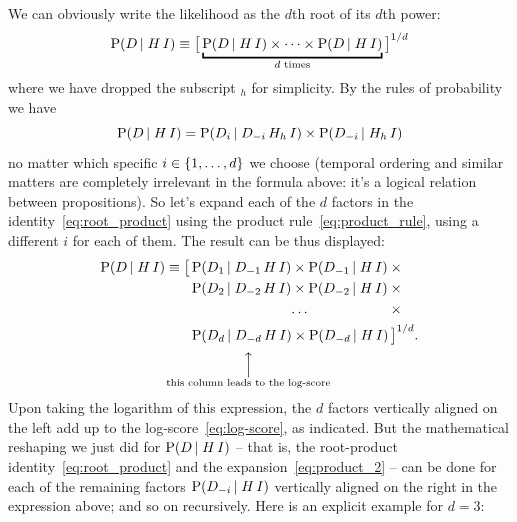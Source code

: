 \documentclass[\ifafour a4paper,12pt,\else a5paper,10pt,\fi%
onecolumn,oneside,article,%
british%
]{memoir}
\theoremstyle{remark}
\theoremstyle{innote}
\DeclarePairedDelimiter\set{\{}{\}}
\newcommand*{\p}{\mathrm{P}}%
\renewcommand*{\|}[1][]{\nonscript\,#1\vert\nonscript\;\mathopen{}}
\newcommand*{\yK}{I}
\begin{document}
We can obviously write the likelihood as the $d$th root of its $d$th power:
\begin{equation}
  \label{eq:root_product}
  \p(D \| H \, \yK) \equiv  \bigl[\,
  \underbracket{\p(D \| H \, \yK) \times \dotsm \times
  \p(D \| H \, \yK)}_{\text{$d$ times}}
  \,\bigr]^{1/d}
\end{equation}
where we have dropped the subscript ${}_{h}$ for simplicity. By the rules
of probability we have
\begin{equation}
  \label{eq:product_rule}
  \p(D \| H \, \yK) =
  \p(D_{i} \| D_{-i} \, H_{h} \, \yK) \times \p(D_{-i} \|  H_{h} \, \yK)
\end{equation}
no matter which specific $i \in \set{1, \dotsc, d}$ we choose (temporal
ordering and similar matters are completely irrelevant in the formula
above: it's a logical relation between propositions). So let's expand each
of the $d$ factors in the identity~\eqref{eq:root_product} using the
product rule~\eqref{eq:product_rule}, using a different $i$ for each of
them. The result can be thus displayed:
\begin{equation}
  \label{eq:product_2}
  \begin{aligned}
    \p(D \| H \, \yK) \equiv{}
    \bigl[\,&\p(D_{1} \| D_{-1} \, H \, \yK) \times
            \p(D_{-1} \|  H \, \yK) \times{}\\
          &\p(D_{2} \| D_{-2} \, H \, \yK) \times
            \p(D_{-2} \| H \, \yK)\times{}\\
          &\hphantom{\p(D_{2} \| D_{-2} \, H \, \yK)}
            \mathrlap{\dotso}\hphantom{{}\times  \p(D_{-2} \| H \, \yK)}\times{}\\
          &\p(D_{d} \|\underbracket[0pt][1ex]{ D_{-d} }_{\mathclap{%
              \substack{\Big\uparrow\\\text{this column leads to the log-score}}%
}} H \, \yK) \times\p(D_{-d} \|  H \, \yK)
            \,\bigr]^{1/d}.
  \end{aligned}
\end{equation}
Upon taking the logarithm of this expression, the $d$ factors vertically
aligned on the left add up to the log-score~\eqref{eq:log-score}, as
indicated. But the mathematical reshaping we just did for
$\p(D \| H \, \yK)$ -- that is, the root-product
identity~\eqref{eq:root_product} and the expansion~\eqref{eq:product_2} --
can be done for each of the remaining factors $\p(D_{-i} \| H \, \yK)$
vertically aligned on the right in the expression above; and so on
recursively. Here is an explicit example for $d=3$:
\end{document}
